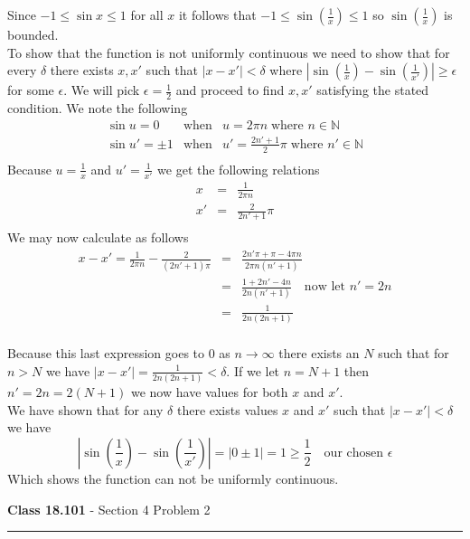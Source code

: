 \documentclass[11pt,reqno]{article}
\begin{document}
\noindent Since $-1 \le \sin x \le 1$ for all $x$ it follows that $-1 \le \sin (\frac{1}{x}) \le 1$ so $\sin(\frac{1}{x})$ is bounded.\\
To show that the function is not uniformly continuous we need to show that for every $\delta$ there exists $x,x'$ such that $|x - x'| < \delta$ where $|\sin(\frac{1}{x}) - \sin(\frac{1}{x'})| \ge \epsilon$ for some $\epsilon$. We will pick $\epsilon = \frac{1}{2}$ and proceed to find $x,x'$ satisfying the stated condition. We note the following 
\begin{eqnarray*}
\sin u = 0 &\text{when} & u = 2 \pi n \; \text{where $n \in \mathbb{N}$} \\
\sin u' = \pm 1 &\text{when}& u' = \frac{2 n' + 1}{2} \pi \; \text{where $n' \in \mathbb{N}$} \\
\end{eqnarray*}
Because $u = \frac{1}{x}$ and $u' = \frac{1}{x'}$ we get the following relations
\begin{eqnarray*}
x &=& \frac{1}{2 \pi n} \\
x' &=& \frac{2}{2n'+1} \pi \\
\end{eqnarray*}
We may now calculate as follows
\begin{eqnarray*}
x - x' = \frac{1}{2 \pi n} - \frac{2}{(2 n' + 1) \pi} &=& \frac{2n' \pi + \pi - 4 \pi n}{2\pi n (n' + 1)} \\
								     &=& \frac{1 +  2n' - 4n}{2 n (n' + 1)} \quad \text{now let $n' = 2n$}\\
								     &=& \frac{1}{2n(2n+1)} \\
\end{eqnarray*}

Because this last expression goes to 0 as $n \to \infty$ there exists an $N$ such that for $n > N$ we have $|x - x'| = \frac{1}{2n(2n+1)} < \delta$. If we let $n = N+1$ then $n' = 2n = 2(N+1)$ we now have values for both $x$ and $x'$.\\
We have shown that for any $\delta$ there exists values $x$ and $x'$ such that $|x - x'| < \delta$ we have 
\[ |\sin (\frac{1}{x}) - \sin(\frac{1}{x'})| = |0 \pm 1| = 1 \ge \frac{1}{2} \quad \text{our chosen $\epsilon$}\]
Which shows the function can not be uniformly continuous.

\begin{flushleft} 
\textbf{Class 18.101} - Section 4 Problem 2\\
\rule{500pt}{1pt}\\
\end{flushleft} 
\end{document}

